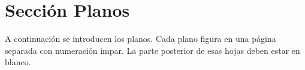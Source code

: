 \documentclass[10pt,a4paper,oneside]{article}
\begin{document}
\section{Sección Planos}%

A continuación se introducen los planos. Cada plano figura en una página separada con numeración impar. La parte posterior de esas hojas deben estar en blanco.




\cleardoublepage
\begin{Plano}[!htb]
\caption[Esquema electrónico de la placa Blue pill]{} %
\label{BluePillSch} %
\end{Plano}


\cleardoublepage
\begin{Plano}[!htb]
\caption[Esquema electrónico del expansor de entradas-salidas IIC]{} %
\label{PCF8574Sch} %
\end{Plano}



\cleardoublepage
\end{document}
